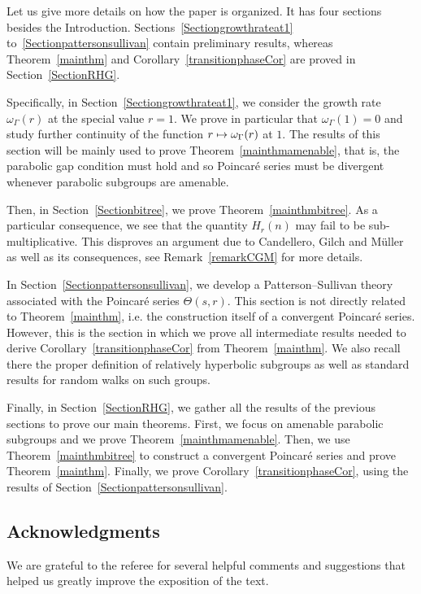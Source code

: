 \documentclass[10pt]{amsart}
\theoremstyle{definition}\newtheorem{defi}[theo]{Definition}\newtheorem{rema}[theo]{Remark}\newtheorem{exam}[theo]{Example}\newtheorem{exem}[theo]{Example}\newtheorem{nota}[theo]{Notation}
\let\oldmapsto\mapsto
\renewcommand*{\mapsto}{\mathchoice{\longmapsto}{\oldmapsto}{\oldmapsto}{\oldmapsto}}
\begin{document}
Let us give more details on how the paper is organized. It has four sections besides the Introduction. Sections~\ref{Sectiongrowthrateat1} to~\ref{Sectionpattersonsullivan} contain preliminary results, whereas Theorem~\ref{mainthm} and Corollary~\ref{transitionphaseCor} are proved in Section~\ref{SectionRHG}.

Specifically, in Section~\ref{Sectiongrowthrateat1}, we consider the growth rate $\omega_\Gamma(r)$ at the special value $r=1$. We prove in particular that $\omega_\Gamma(1)=0$ and study further continuity of the function $r\mapsto \omega_\Gamma(r)$ at $1$. The results of this section will be mainly used to prove Theorem~\ref{mainthmamenable}, that is, the parabolic gap condition must hold and so Poincaré series must be divergent whenever parabolic subgroups are amenable.

Then, in Section~\ref{Sectionbitree}, we prove Theorem~\ref{mainthmbitree}. As a particular consequence, we see that the quantity $H_r(n)$ may fail to be sub-multiplicative. This disproves an argument due to Candellero, Gilch and Müller~\cite{CandelleroGilchMuller} as well as its consequences, see Remark~\ref{remarkCGM} for more details.

In Section~\ref{Sectionpattersonsullivan}, we develop a Patterson--Sullivan theory associated with the Poincaré series $\Theta(s,r)$. This section is not directly related to Theorem~\ref{mainthm}, i.e. the construction itself of a convergent Poincaré series. However, this is the section in which we prove all intermediate results needed to derive Corollary~\ref{transitionphaseCor} from Theorem~\ref{mainthm}. We also recall there the proper definition of relatively hyperbolic subgroups as well as standard results for random walks on such groups.

Finally, in Section~\ref{SectionRHG}, we gather all the results of the previous sections to prove our main theorems. First, we focus on amenable parabolic subgroups and we prove Theorem~\ref{mainthmamenable}. Then, we use Theorem~\ref{mainthmbitree} to construct a convergent Poincaré series and prove Theorem~\ref{mainthm}. Finally, we prove Corollary~\ref{transitionphaseCor}, using the results of Section~\ref{Sectionpattersonsullivan}.

\subsection*{Acknowledgments}
We are grateful to the referee for several helpful comments and suggestions that helped us greatly improve the exposition of the text.
\end{document}
